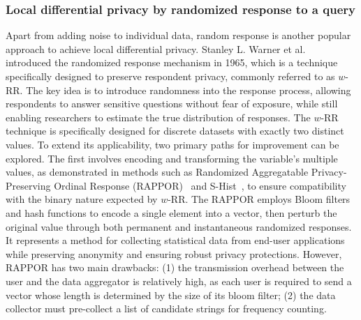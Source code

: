 \subsubsection{Local differential privacy by randomized response to a query}
Apart from adding noise to individual data, random response is another popular approach to achieve local differential privacy. Stanley L. Warner et al.~\cite{warner1965randomized} introduced the randomized response mechanism in 1965, which is a technique specifically designed to preserve respondent privacy, commonly referred to as $w$-RR. The key idea is to introduce randomness into the response process, allowing respondents to answer sensitive questions without fear of exposure, while still enabling researchers to estimate the true distribution of responses.
The $w$-RR technique is specifically designed for discrete datasets with exactly two distinct values. 
To extend its applicability, two primary paths for improvement can be explored. The first involves encoding and transforming the variable's multiple values, as demonstrated in methods such as Randomized Aggregatable Privacy-Preserving Ordinal Response (RAPPOR)~\cite{rappor} and S-Hist~\cite{bassily2015local}, to ensure compatibility with the binary nature expected by $w$-RR.
The RAPPOR employs Bloom filters and hash functions to encode a single element into a vector, then perturb the original value through both permanent and instantaneous randomized responses. It represents a method for collecting statistical data from end-user applications while preserving anonymity and ensuring robust privacy protections. 
However, RAPPOR has two main drawbacks: (1) the transmission overhead between the user and the data aggregator is relatively high, as each user is required to send a vector whose length is determined by the size of its bloom filter; (2) the data collector must pre-collect a list of candidate strings for frequency counting. 

